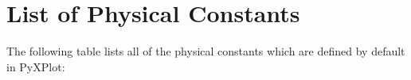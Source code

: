 %
%
%
%
%



\chapter{List of Physical Constants}
\label{function_list}

The following table lists all of the physical constants which are defined by default in PyXPlot:

